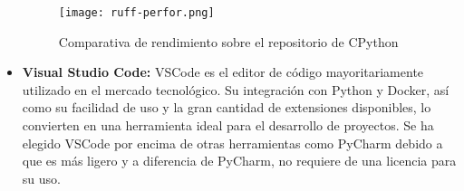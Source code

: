\begin{itemize}
    \begin{figure}[ht]
        \centering
        \texttt{[image: ruff-perfor.png]}
        \caption{Comparativa de rendimiento sobre el repositorio de CPython}\label{fig:ruff-perfor}
    \end{figure}
    \item \textbf{Visual Studio Code:} VSCode es el editor de código mayoritariamente utilizado
    en el mercado tecnológico. Su integración con Python y Docker, así como su facilidad de uso
    y la gran cantidad de extensiones disponibles, lo convierten en una herramienta ideal para
    el desarrollo de proyectos. Se ha elegido VSCode por encima de otras herramientas como PyCharm
    debido a que es más ligero y a diferencia de PyCharm, no requiere de una licencia para su uso.
\end{itemize}